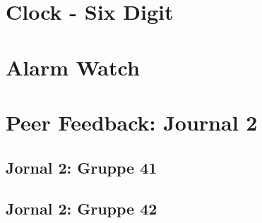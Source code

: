 \documentclass[12pt,a4paper]{article}
\begin{document}
\section{Clock - Six Digit}


\section{Alarm Watch}


\section{Peer Feedback: Journal 2}
\subsection{Jornal 2: Gruppe 41}

\subsection{Jornal 2: Gruppe 42}
\end{document}
